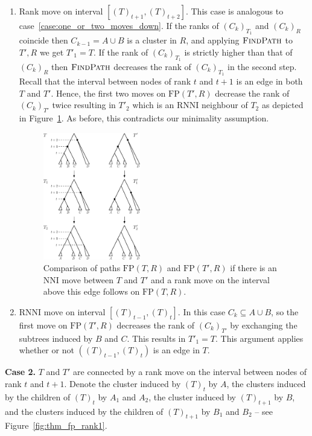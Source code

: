 \documentclass[11pt]{amsart}
\newcommand{\rnni}{\mathrm{RNNI}}
\newcommand{\findpath}{\textsc{FindPath}}
\newcommand{\nni}{\mathrm{NNI}}
\newcommand{\fp}{\mathrm{FP}}
\begin{document}
\begin{enumerate}[label = 1.{\arabic*}]
\item Rank move on interval $[(T)_{t+1},(T)_{t+2}]$.
\label{case:rank_move_interval_above}
This case is analogous to case~\ref{case:one_or_two_moves_down}.
If the ranks of $(C_k)_{T_1}$ and $(C_k)_R$ coincide then $C_{k-1} = A \cup B$ is a cluster in $R$, and applying $\findpath$ to $T', R$ we get $T'_1 = T$.
If the rank of $(C_k)_{T_1}$ is strictly higher than that of $(C_k)_R$ then $\findpath$ decreases the rank of $(C_k)_{T_1}$ in the second step.
Recall that the interval between nodes of rank $t$ and $t+1$ is an edge in both $T$ and $T'$.
Hence, the first two moves on $\fp(T', R)$ decrease the rank of $(C_k)_{T'}$ twice resulting in $T'_2$ which is an $\rnni$ neighbour of $T_2$ as depicted in Figure~\ref{fig:thm_fp_nni3}.
As before, this contradicts our minimality assumption.
\begin{figure}[ht]
	\centering
	\includegraphics[width=0.4\textwidth]{thm_fp_nni3}
	\caption{Comparison of paths $\fp(T, R)$ and $\fp(T', R)$ if there is an $\nni$ move between $T$ and $T'$ and a rank move on the interval above this edge follows on $\fp(T, R)$.}
	\label{fig:thm_fp_nni3}
\end{figure}

\item $\rnni$ move on interval $[(T)_{t-1},(T)_t]$.
In this case $C_k \subseteq A \cup B$, so the first move on $\fp(T', R)$ decreases the rank of $(C_k)_{T'}$ by exchanging the subtrees induced by $B$ and $C$.
This results in $T'_1 = T$.
This argument applies whether or not $((T)_{t-1},(T)_t)$ is an edge in $T$.
\end{enumerate}

\textbf{Case 2.}
$T$ and $T'$ are connected by a rank move on the interval between nodes of rank $t$ and $t+1$.
Denote the cluster induced by $(T)_t$ by $A$, the clusters induced by the children of $(T)_t$ by $A_1$ and $A_2$, the cluster induced by $(T)_{t+1}$ by $B$, and the clusters induced by the children of $(T)_{t+1}$ by $B_1$ and $B_2$ -- see Figure~\ref{fig:thm_fp_rank1}.
\end{document}
